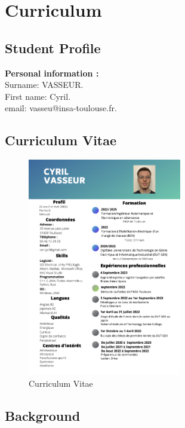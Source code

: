 \section{Curriculum}

\subsection{Student Profile}

\textbf{Personal information :} \\
Surname: VASSEUR.  \\
First name: Cyril.  \\
email: vasseu@insa-toulouse.fr.  \\

\subsection{Curriculum Vitae}

\begin{figure}[!ht]
    \centering
    \includegraphics[width=0.6\textwidth]{image/CV_CYRIL VASSEUR.png}
    \caption{Curriculum Vitae}
    \label{fig:Curriculum Vitae}
\end{figure}

\vspace{1em} 

\newpage
\subsection{Background}

